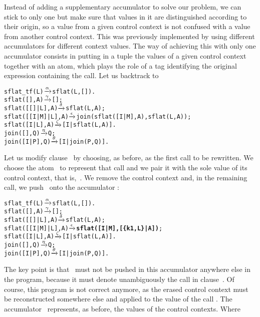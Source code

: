Instead of adding a supplementary accumulator to solve our problem, we
can stick to only one but make sure that values in it are
distinguished according to their origin, so a value from a given
control context is not confused with a value from another control
context. This was previously implemented by using different
accumulators for different context values. The way of achieving this
with only one accumulator consists in putting in a tuple the values of
a given control context together with an atom, which plays the role of
a tag identifying the original expression containing the call. Let us
backtrack to
\begin{alltt}
sflat_tf(L)        \(\smashedrightarrow{\alpha}\) sflat(L,[]).
sflat(       [],A) \(\smashedrightarrow{\gamma}\) [];\hfill% A \emph{unused yet}
sflat(   [[]|L],A) \(\smashedrightarrow{\delta}\) sflat(L,A);
sflat([[I|M]|L],A) \(\smashedrightarrow{\epsilon}\) join(sflat([I|M],A),sflat(L,A));
sflat(    [I|L],A) \(\smashedrightarrow{\zeta}\) [I|sflat(L,A)].
join(   [],Q)      \(\smashedrightarrow{\eta}\) Q;
join([I|P],Q)      \(\smashedrightarrow{\theta}\) [I|join(P,Q)].
\end{alltt}
Let us modify clause~\clause{\epsilon} by choosing, as before,
 as the first call to be rewritten. We choose
the atom~ to represent that call and we pair it with the
sole value of its control context, that is,~. We remove the
control context  and, in
the remaining call, we push~ onto the accumulator
:
\begin{alltt}
sflat_tf(L)        \(\smashedrightarrow{\alpha}\) sflat(L,[]).
sflat(       [],A) \(\smashedrightarrow{\gamma}\) [];\hfill% A \emph{unused yet}
sflat(   [[]|L],A) \(\smashedrightarrow{\delta}\) sflat(L,A);
sflat([[I|M]|L],A) \(\smashedrightarrow{\epsilon}\) \textbf{sflat([I|M],[\{k1,L\}|A])};
sflat(    [I|L],A) \(\smashedrightarrow{\zeta}\) [I|sflat(L,A)].
join(   [],Q)      \(\smashedrightarrow{\eta}\) Q;
join([I|P],Q)      \(\smashedrightarrow{\theta}\) [I|join(P,Q)].
\end{alltt}
The key point is that ~must not be pushed in this
accumulator anywhere else in the program, because it must denote
unambiguously the call in clause~\clause{\epsilon}. Of course, this
program is not correct anymore, as the erased control context must be
reconstructed somewhere else and applied to the value of the call
. The accumulator~
represents, as before, the values of the control contexts. Where
